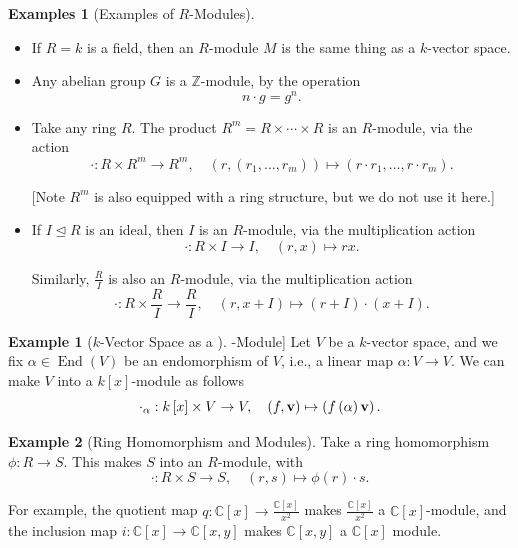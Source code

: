 \documentclass{article}
\theoremstyle{definition}
\newtheorem*{example*}{Example}
\newtheorem{examples}[theorem]{Examples}
\theoremstyle{remark}
\newcommand{\pqty}[1]{\left(#1\right)}
\newcommand{\bqty}[1]{\left[#1\right]}
\newcommand{\flatfrac}[2]{\frac{#1}{#2}}
\newcommand{\functiondomain}[3]{#1:#2\to #3}
\newcommand{\function}[5]{#1:#2\to #3,\quad #4\mapsto #5}
\newcommand{\idealsub}{\trianglelefteq}
\newcommand{\ZZ}{\mathbb{Z}}
\newcommand{\CC}{\mathbb{C}}
\newcommand{\End}{\operatorname{End}}
\begin{document}
\begin{examples}[Examples of \(R\)-Modules]
    \label{ex:examples-r-modules}%
    \begin{itemize}
        \item If \(R = k\) is a field, then an \(R\)-module \(M\) is the same thing as a \(k\)-vector space.
        \item Any abelian group \(G\) is a \(\ZZ\)-module, by the operation
        \[
            n \cdot g = g^n.
        \]
        \item Take any ring \(R\). The product \(R^m = R \times \cdots \times R\) is an \(R\)-module, via the action
        \[
            \function{\cdot}{R \times R^m}{R^m}{\pqty{r, \pqty{r_1, \ldots, r_m}}}{\pqty{r \cdot r_1, \ldots, r \cdot r_m}.}
        \]

        [Note \(R^m\) is also equipped with a ring structure, but we do not use it here.]

        \item If \(I \idealsub R\) is an ideal, then \(I\) is an \(R\)-module, via the multiplication action
        \[
            \function{\cdot}{R \times I}{I}{\pqty{r, x}}{rx.}
        \]

        Similarly, \(\flatfrac{R}{I}\) is also an \(R\)-module, via the multiplication action
        \[
            \function{\cdot}{R \times \flatfrac{R}{I}}{\flatfrac{R}{I}}{\pqty{r, x + I}}{\pqty{r + I} \cdot \pqty{x + I}.}
        \]
    \end{itemize}
\end{examples}

\begin{example*}[\(k\)-Vector Space as a \(k\bqty{x}\)-Module]
    Let \(V\) be a \(k\)-vector space, and we fix \(\alpha \in \End\pqty{V}\) be an endomorphism of \(V\), i.e., a linear map \(\functiondomain{\alpha}{V}{V}\). We can make \(V\) into a \(k\bqty{x}\)-module as follows
    \[
        \function{\cdot_{\alpha}}{k\bqty{x} \times V}{V}{\pqty{f, \vb{v}}}{\pqty{f\pqty{\alpha} \vb{v}}.}
    \]
\end{example*}

\begin{example*}[Ring Homomorphism and Modules]
    Take a ring homomorphism \(\functiondomain{\phi}{R}{S}\). This makes \(S\) into an \(R\)-module, with
    \[
        \function{\cdot}{R \times S}{S}{\pqty{r, s}}{\phi\pqty{r} \cdot s.}
    \]

    For example, the quotient map \(\functiondomain{q}{\CC\bqty{x}}{\flatfrac{\CC\bqty{x}}{x^2}}\) makes \(\flatfrac{\CC\bqty{x}}{x^2}\) a \(\CC\bqty{x}\)-module, and the inclusion map \(\functiondomain{i}{\CC\bqty{x}}{\CC\bqty{x, y}}\) makes \(\CC\bqty{x, y}\) a \(\CC\bqty{x}\) module.
\end{example*}
\end{document}
